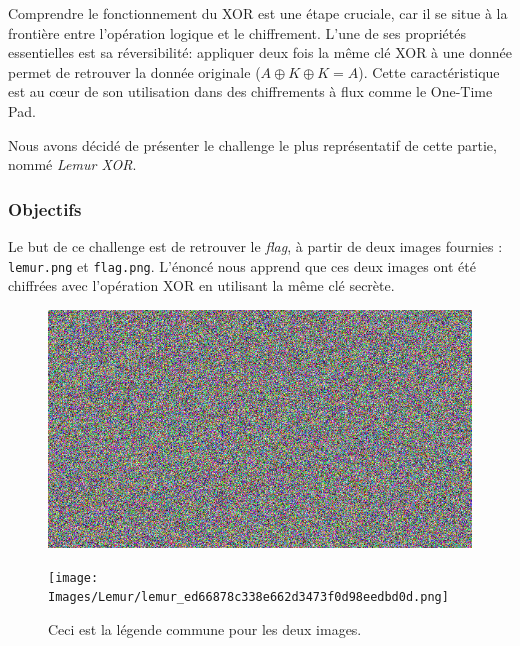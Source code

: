 \documentclass[12pt, a4paper]{article}
\begin{document}
        Comprendre le fonctionnement du XOR est une étape cruciale, car il se situe à la 
        frontière entre l'opération logique et le chiffrement. L'une de ses propriétés 
        essentielles est sa réversibilité: appliquer deux fois la même clé XOR 
        à une donnée permet de retrouver la donnée originale ($A \oplus K \oplus K = A$). 
        Cette caractéristique est au cœur de son utilisation dans des chiffrements à flux 
        comme le One-Time Pad.
        
        Nous avons décidé de présenter le challenge le plus représentatif de cette partie, 
        nommé \textit{Lemur XOR}.
        
        \subsubsection{Objectifs}
        
        Le but de ce challenge est de retrouver le \textit{flag}, à partir de deux images fournies : \texttt{lemur.png} et \texttt{flag.png}. L'énoncé nous apprend que ces deux images ont été chiffrées avec l'opération XOR en utilisant la même clé secrète.

        \begin{figure}[htbp] %
            \centering %
        
            \begin{minipage}{0.48\textwidth}
                \centering
                \includegraphics[width=\linewidth]{Images/Lemur/flag.png} %
            \end{minipage}
            \hfill %
            \begin{minipage}{0.48\textwidth}
                \centering
                \texttt{[image: Images/Lemur/lemur\_ed66878c338e662d3473f0d98eedbd0d.png]} %
            \end{minipage}
        
            \caption{Ceci est la légende commune pour les deux images.}
            \label{fig:deux-images}
        \end{figure}
        
\end{document}
